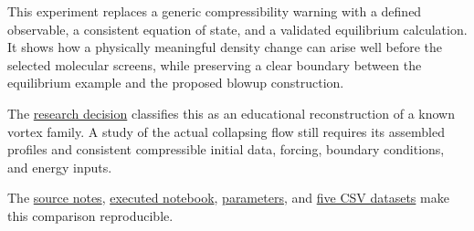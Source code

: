 \documentclass[
  english,
  11pt,
]{article}
\begin{document}
This experiment replaces a generic compressibility warning with a
defined observable, a consistent equation of state, and a validated
equilibrium calculation. It shows how a physically meaningful density
change can arise well before the selected molecular screens, while
preserving a clear boundary between the equilibrium example and the
proposed blowup construction.

The \href{research-decision.md}{research decision} classifies this as an
educational reconstruction of a known vortex family. A study of the
actual collapsing flow still requires its assembled profiles and
consistent compressible initial data, forcing, boundary conditions, and
energy inputs.

The \href{source-notes.md}{source notes},
\href{../../code/d10_compressible_vortex/study.ipynb}{executed
notebook},
\href{../../code/d10_compressible_vortex/parameters.json}{parameters},
and \href{../../code/d10_compressible_vortex/data/}{five CSV datasets}
make this comparison reproducible.
\end{document}
